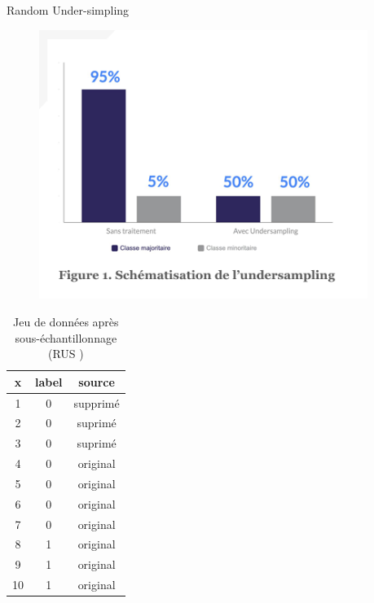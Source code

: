 \documentclass{beamer}
\begin{document}
\begin{frame}{Random Under-simpling}
\begin{figure}
    \centering
    \includegraphics[width=0.95\textwidth]{images/RUS.png}

\end{figure}
\end{frame}

\begin{frame}
\begin{table}
\centering
\caption{Jeu de données après sous-échantillonnage (RUS )}
\begin{tabular}{|c|c|c|}
\hline
\textbf{x} & \textbf{label} & \textbf{source} \\ 
\hline
1   & 0 & supprimé\\
2 &  0 & suprimé \\
3 &  0 & suprimé \\
4 &  0 & original \\
5 &  0 & original \\
6 &  0 & original \\
7 &  0 & original \\
8 &  1 & original \\
9 &  1 & original \\
10 &  1 & original \\

\hline
\end{tabular}
\end{table}
\end{frame}
\end{document}
